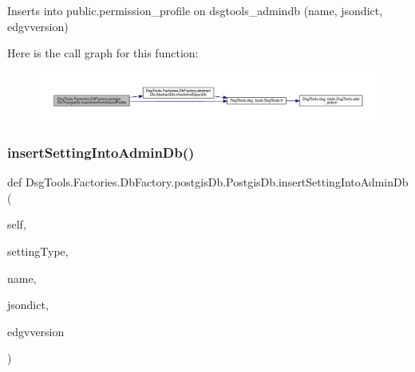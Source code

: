 \begin{DoxyVerb}Inserts into public.permission_profile on dsgtools_admindb (name, jsondict, edgvversion)
\end{DoxyVerb}
 Here is the call graph for this function\+:
\nopagebreak
\begin{figure}[H]
\begin{center}
\leavevmode
\includegraphics[width=350pt]{class_dsg_tools_1_1_factories_1_1_db_factory_1_1postgis_db_1_1_postgis_db_aefad0da85c6707d0b4c8e52781873d63_cgraph}
\end{center}
\end{figure}
\mbox{\label{class_dsg_tools_1_1_factories_1_1_db_factory_1_1postgis_db_1_1_postgis_db_ab0b5f32dfd0746bdbf5fa2c43551ee47}} 
\subsubsection{\texorpdfstring{insert\+Setting\+Into\+Admin\+Db()}{insertSettingIntoAdminDb()}}
{\footnotesize\ttfamily def Dsg\+Tools.\+Factories.\+Db\+Factory.\+postgis\+Db.\+Postgis\+Db.\+insert\+Setting\+Into\+Admin\+Db (\begin{DoxyParamCaption}\item[{}]{self,  }\item[{}]{setting\+Type,  }\item[{}]{name,  }\item[{}]{jsondict,  }\item[{}]{edgvversion }\end{DoxyParamCaption})}

